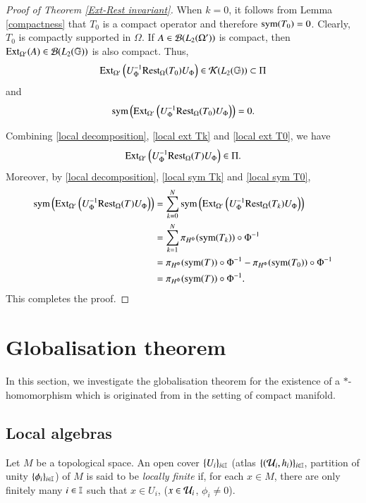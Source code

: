 \documentclass[leqno]{amsart}
\begin{document}
\begin{proof}[Proof of Theorem \ref{Ext-Rest invariant}]
		
		When $k=0$, it follows from Lemma \ref{compactness} that $T_{0}$ is a compact operator and therefore ${\rm sym}(T_{0})=0$. Clearly, $T_{0}$ is compactly supported in $\Omega$. If $A\in{\mathcal B}(L_{2}(\Omega'))$ is compact, then ${\rm Ext}_{\Omega'}(A)\in{\mathcal B}(L_{2}(\mathbb{G}))$ is also compact. Thus, 
		\begin{align}\label{local ext T0}
			{\rm Ext}_{\Omega'}\left(U_{\Phi}^{-1} {\rm Rest}_{\Omega}(T_{0}) U_{\Phi}\right)\in{\mathcal K}(L_{2}(\mathbb{G}))\subset\Pi
		\end{align} 
		and
		\begin{align}\label{local sym T0}
			{\rm sym}\left({\rm Ext}_{\Omega'}\left(U_{\Phi}^{-1} {\rm Rest}_{\Omega}(T_{0}) U_{\Phi}\right)\right)=0.
		\end{align}
		
		Combining \eqref{local decomposition}, \eqref{local ext Tk} and \eqref{local ext T0}, we have $${\rm Ext}_{\Omega'}\left(U_{\Phi}^{-1} {\rm Rest}_{\Omega}(T) U_{\Phi}\right)\in\Pi.$$
		Moreover, by \eqref{local decomposition}, \eqref{local sym Tk} and \eqref{local sym T0},
		\begin{align*}
			{\rm sym}\left({\rm Ext}_{\Omega'}\left(U_{\Phi}^{-1} {\rm Rest}_{\Omega}(T) U_{\Phi}\right)\right)
			&=\sum_{k=0}^{N}{\rm sym}\left({\rm Ext}_{\Omega'}\left(U_{\Phi}^{-1} {\rm Rest}_{\Omega}(T_{k}) U_{\Phi}\right)\right)\\
			&=\sum_{k=1}^{N}\pi_{H^{\Phi}}({\rm sym}(T_{k}))\circ\Phi^{-1}\\
			&=\pi_{H^{\Phi}}({\rm sym}(T))\circ\Phi^{-1}-\pi_{H^{\Phi}}({\rm sym}(T_{0}))\circ\Phi^{-1}\\
			&=\pi_{H^{\Phi}}({\rm sym}(T))\circ\Phi^{-1}.
		\end{align*}
		This completes the proof.
	\end{proof}
	
	
	
	
	
	
	\section{Globalisation theorem}\label{Globalisation theorem}
	In this section, we investigate the globalisation theorem for the existence of a $*$-homomorphism which is originated from \cite{DAO3} in the setting of compact manifold.
	\subsection{Local algebras}
	\begin{definition}
		Let $M$ be a topological space. An open cover $\{U_i\}_{i\in\mathbb I}$ (atlas $\{({\mathcal U}_i, h_i)\}_{i\in\mathbb I}$, partition of unity $\{\phi_i\}_{i\in\mathbb I}$) of $M$ is said to be \textit{locally finite} if, for each $x\in M$, there are only finitely many $i\in\mathbb I$ such that $x\in U_i$, ($x\in{\mathcal U}_i$, $\phi_i\neq 0$).
	\end{definition}
	
\end{document}
